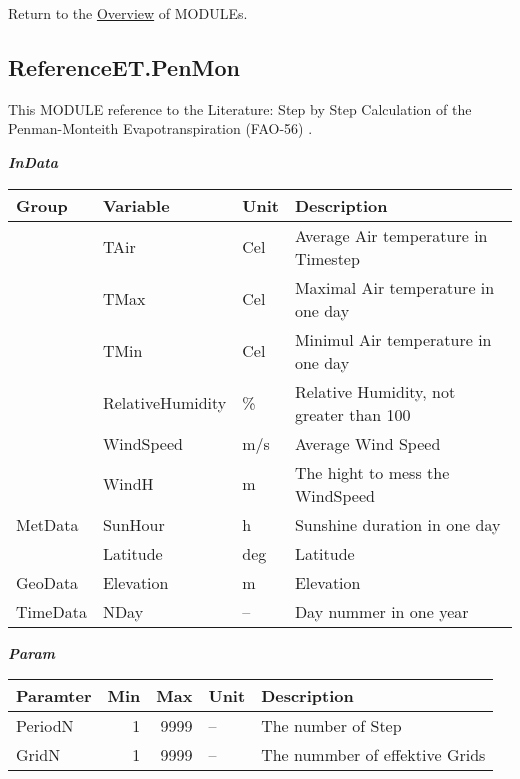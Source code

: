 \documentclass[
]{book}
\begin{document}
Return to the \protect\hyperlink{module}{Overview} of MODULEs.

\hypertarget{ReferenceET.PenMon}{%
\subsection{ReferenceET.PenMon}\label{ReferenceET.PenMon}}

This MODULE reference to the Literature: Step by Step Calculation of the Penman-Monteith Evapotranspiration (FAO-56) \citep{LincolnZotarelli.2014}.

\textbf{\emph{InData}}

\begin{table}[!h]
\centering
\begin{tabular}{l|l|l|l}
\hline
Group & Variable & Unit & Description\\
\hline
 & TAir & Cel & Average Air temperature in Timestep\\
\cline{2-4}
 & TMax & Cel & Maximal Air temperature in one day\\
\cline{2-4}
 & TMin & Cel & Minimul Air temperature in one day\\
\cline{2-4}
 & RelativeHumidity & \% & Relative Humidity, not greater than 100\\
\cline{2-4}
 & WindSpeed & m/s & Average Wind Speed\\
\cline{2-4}
 & WindH & m & The hight to mess the WindSpeed\\
\cline{2-4}
\multirow{-7}{*}{\raggedright\arraybackslash MetData} & SunHour & h & Sunshine duration in one day\\
\cline{1-4}
 & Latitude & deg & Latitude\\
\cline{2-4}
\multirow{-2}{*}{\raggedright\arraybackslash GeoData} & Elevation & m & Elevation\\
\cline{1-4}
TimeData & NDay & -- & Day nummer in one year\\
\hline
\end{tabular}
\end{table}

\textbf{\emph{Param}}

\begin{table}[!h]
\centering
\begin{tabular}{l|r|r|l|l}
\hline
Paramter & Min & Max & Unit & Description\\
\hline
PeriodN & 1 & 9999 & -- & The number of Step\\
\cline{1-5}
GridN & 1 & 9999 & -- & The nummber of effektive Grids\\
\hline
\end{tabular}
\end{table}
\end{document}
